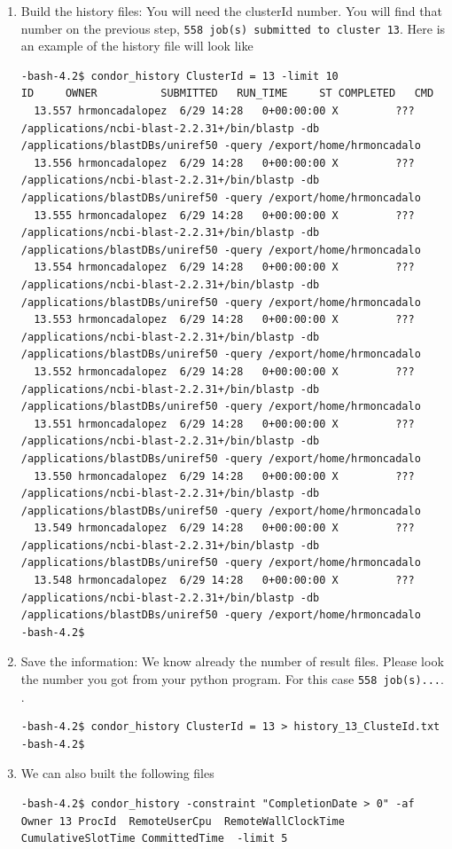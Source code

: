 \documentclass{article}
\begin{document}
\begin{enumerate}
\item Build the history files: You will need the clusterId number. You will find that number on the previous step, \verb+558 job(s) submitted to cluster 13+. 
Here is an example of the history file will look like
\tiny
\begin{verbatim}
-bash-4.2$ condor_history ClusterId = 13 -limit 10
ID     OWNER          SUBMITTED   RUN_TIME     ST COMPLETED   CMD            
  13.557 hrmoncadalopez  6/29 14:28   0+00:00:00 X         ???  /applications/ncbi-blast-2.2.31+/bin/blastp -db /applications/blastDBs/uniref50 -query /export/home/hrmoncadalo
  13.556 hrmoncadalopez  6/29 14:28   0+00:00:00 X         ???  /applications/ncbi-blast-2.2.31+/bin/blastp -db /applications/blastDBs/uniref50 -query /export/home/hrmoncadalo
  13.555 hrmoncadalopez  6/29 14:28   0+00:00:00 X         ???  /applications/ncbi-blast-2.2.31+/bin/blastp -db /applications/blastDBs/uniref50 -query /export/home/hrmoncadalo
  13.554 hrmoncadalopez  6/29 14:28   0+00:00:00 X         ???  /applications/ncbi-blast-2.2.31+/bin/blastp -db /applications/blastDBs/uniref50 -query /export/home/hrmoncadalo
  13.553 hrmoncadalopez  6/29 14:28   0+00:00:00 X         ???  /applications/ncbi-blast-2.2.31+/bin/blastp -db /applications/blastDBs/uniref50 -query /export/home/hrmoncadalo
  13.552 hrmoncadalopez  6/29 14:28   0+00:00:00 X         ???  /applications/ncbi-blast-2.2.31+/bin/blastp -db /applications/blastDBs/uniref50 -query /export/home/hrmoncadalo
  13.551 hrmoncadalopez  6/29 14:28   0+00:00:00 X         ???  /applications/ncbi-blast-2.2.31+/bin/blastp -db /applications/blastDBs/uniref50 -query /export/home/hrmoncadalo
  13.550 hrmoncadalopez  6/29 14:28   0+00:00:00 X         ???  /applications/ncbi-blast-2.2.31+/bin/blastp -db /applications/blastDBs/uniref50 -query /export/home/hrmoncadalo
  13.549 hrmoncadalopez  6/29 14:28   0+00:00:00 X         ???  /applications/ncbi-blast-2.2.31+/bin/blastp -db /applications/blastDBs/uniref50 -query /export/home/hrmoncadalo
  13.548 hrmoncadalopez  6/29 14:28   0+00:00:00 X         ???  /applications/ncbi-blast-2.2.31+/bin/blastp -db /applications/blastDBs/uniref50 -query /export/home/hrmoncadalo
-bash-4.2$ 
\end{verbatim}
\normalsize
\item  Save the information: We know already the number of result files. Please look the number you got from your python program. For this case \verb+558 job(s)...+. . 
\tiny
\begin{verbatim}
-bash-4.2$ condor_history ClusterId = 13 > history_13_ClusteId.txt
-bash-4.2$ 
\end{verbatim}
\normalsize
\item We can also built the following files
\tiny
\begin{verbatim}
-bash-4.2$ condor_history -constraint "CompletionDate > 0" -af Owner 13 ProcId  RemoteUserCpu  RemoteWallClockTime CumulativeSlotTime CommittedTime  -limit 5
    

\end{verbatim}
\end{enumerate}
\end{document}
